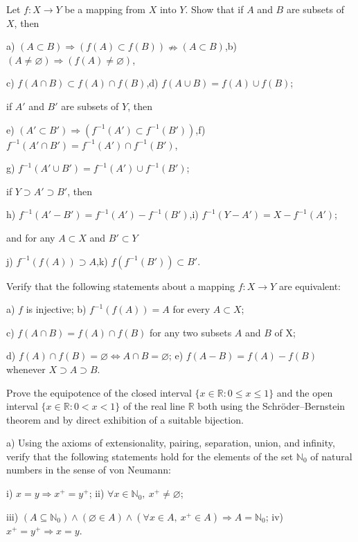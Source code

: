 \documentclass[lang=cn, zihao=5]{elegantbook}
\begin{document}
\begin{exercise}
	Let $f:X \to Y$ be a mapping from $X$ into $Y$. Show that if $A$ and $B$ are subsets of $X$, then
	
	a) $(A \subset B) \Rightarrow (f(A) \subset f(B)) \nRightarrow (A \subset B)$,\qquad b) $(A \neq \varnothing) \Rightarrow (f(A) \neq \varnothing)$,
	
	c) $f(A \cap B) \subset f(A) \cap f(B)$,\qquad d) $f(A \cup B) = f(A) \cup f(B)$;
	
	\noindent
	if $A'$ and $B'$ are subsets of $Y$, then
	
	e) $(A' \subset B') \Rightarrow (f^{-1}(A') \subset f^{-1}(B'))$,\qquad f) $f^{-1}(A' \cap B') = f^{-1}(A') \cap f^{-1}(B')$,
	
	g) $f^{-1}(A' \cup B') = f^{-1}(A') \cup f^{-1}(B')$;
	
	\noindent
	if $Y \supset A' \supset B'$, then
	
	h) $f^{-1}(A'-B') = f^{-1}(A') - f^{-1}(B')$,\qquad i) $f^{-1}(Y-A') = X-f^{-1}(A')$;
	
	\noindent
	and for any $A \subset X$ and $B' \subset Y$
	
	j) $f^{-1}(f(A)) \supset A$,\qquad k) $f(f^{-1}(B')) \subset B'$.
\end{exercise}

\begin{exercise}
	Verify that the following statements about a mapping $f:X \to Y$ are equivalent:
	
	a) $f$ is injective; \qquad b) $f^{-1}(f(A))=A$ for every $A \subset X$;
	
	c) $f(A \cap B) = f(A) \cap f(B)$ for any two subsets $A$ and $B$ of X;
	
	d) $f(A) \cap f(B) = \varnothing \Leftrightarrow A \cap B = \varnothing$; \qquad e) $f(A-B) = f(A) - f(B)$ whenever $X \supset A \supset B$.
\end{exercise}

\begin{exercise}
	Prove the equipotence of the closed interval $\{x \in \mathbb{R} : 0 \leq x \leq 1\}$ and the open interval $\{x \in \mathbb{R} : 0 < x < 1\}$ of the real line $\mathbb{R}$ both using the Schröder–Bernstein theorem and by direct exhibition of a suitable bijection.
\end{exercise}

\begin{exercise}
	a) Using the axioms of extensionality, pairing, separation, union, and infinity, verify that the following statements hold for the elements of the set $\mathbb{N}_0$ of natural numbers in the sense of von Neumann: 
	
	i) $x=y \Rightarrow x^+ = y^+$; \qquad ii) $\forall x \in \mathbb{N}_0,~x^+ \neq \varnothing$;
	
	iii) $(A \subseteq \mathbb{N}_0) \wedge (\varnothing \in A) \wedge (\forall x \in A,~x^+ \in A) \Rightarrow A=\mathbb{N}_0$; \qquad iv) $x^+=y^+ \Rightarrow x=y$.
\end{exercise}
\end{document}
